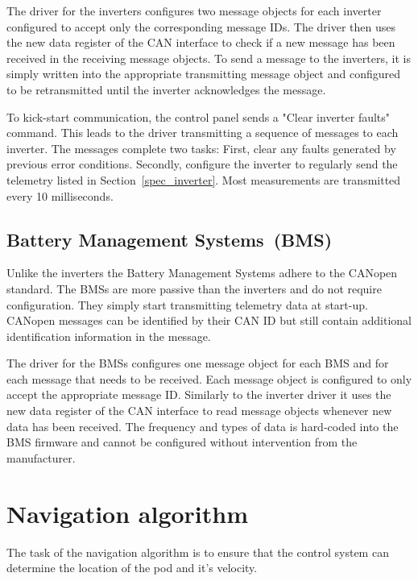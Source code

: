 The driver for the inverters configures two message objects for each inverter configured to accept only the corresponding message IDs. The driver then uses the new data register of the CAN interface to check if a new message has been received in the receiving message objects. To send a message to the inverters, it is simply written into the appropriate transmitting message object and configured to be retransmitted until the inverter acknowledges the message.

To kick-start communication, the control panel sends a "Clear inverter faults" command. This leads to the driver transmitting a sequence of messages to each inverter. The messages complete two tasks: First, clear any faults generated by previous error conditions. Secondly, configure the inverter to regularly send the telemetry listed in Section~\ref{spec_inverter}. Most measurements are transmitted every 10 milliseconds.

\subsection{Battery Management Systems (BMS)}

Unlike the inverters the Battery Management Systems adhere to the CANopen standard\cite{canopen}. The BMSs are more passive than the inverters and do not require configuration. They simply start transmitting telemetry data at start-up. CANopen messages can be identified by their CAN ID but still contain additional identification information in the message.

The driver for the BMSs configures one message object for each BMS and for each message that needs to be received. Each message object is configured to only accept the appropriate message ID. Similarly to the inverter driver it uses the new data register of the CAN interface to read message objects whenever new data has been received. The frequency and types of data is hard-coded into the BMS firmware and cannot be configured without intervention from the manufacturer.

\section{Navigation algorithm}

The task of the navigation algorithm is to ensure that the control system can determine the location of the pod and it's velocity.

